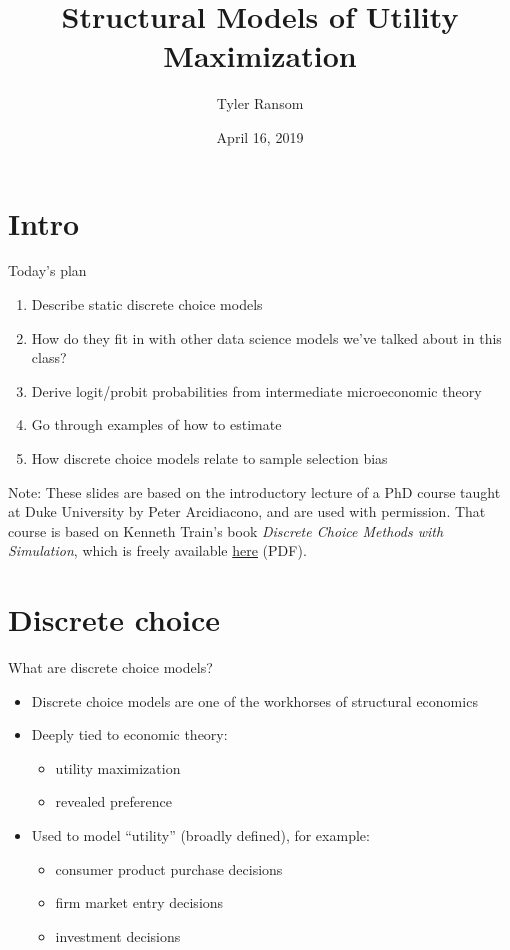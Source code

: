 \documentclass[english,aspectratio=169,12pt,xcolor=dvipsnames]{beamer}
\title{Structural Models of Utility Maximization}
\author{Tyler Ransom}
\institute[OU Econ]{\normalsize{University of Oklahoma, Dept. of Economics}}
\date{April 16, 2019}
\begin{document}
{
\frame[noframenumbering]{\titlepage}
}




\section{Intro}
\begin{frame}{Today's plan}
\begin{enumerate}
\item Describe static discrete choice models
\item How do they fit in with other data science models we've talked about in this class?
\item Derive logit/probit probabilities from intermediate microeconomic theory
\item Go through examples of how to estimate
\item How discrete choice models relate to sample selection bias
\end{enumerate}

\bigskip{}
\bigskip{}

\footnotesize{Note: These slides are based on the introductory lecture of a PhD course taught at Duke University by Peter Arcidiacono, and are used with permission. That course is based on Kenneth Train's book \emph{Discrete Choice Methods with Simulation}, which is freely available \href{https://eml.berkeley.edu/books/train1201.pdf}{here} (PDF).}
\end{frame}



\section{Discrete choice}
\begin{frame}{What are discrete choice models?}
\begin{itemize}
\item Discrete choice models are one of the workhorses of structural economics
\item Deeply tied to economic theory:
    \begin{itemize}
    \item utility maximization
    \item revealed preference
    \end{itemize}
\item Used to model ``utility'' (broadly defined), for example:
    \begin{itemize}
    \item consumer product purchase decisions
    \item firm market entry decisions
    \item investment decisions
    \end{itemize}
\end{itemize}
\end{frame}
\end{document}
